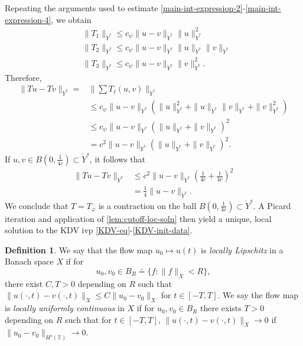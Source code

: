 \documentclass[12pt,reqno]{amsart}
\numberwithin{equation}{section}  %
\numberwithin{figure}{section}
\newcommand{\ci}{\mathbb{T}}
\newcommand{\vp}{\varphi}
\theoremstyle{plain}
\theoremstyle{definition}
\newtheorem{definition}{Definition}
\theoremstyle{remark}
\begin{document}
Repeating the arguments used to estimate 
\eqref{main-int-expression-2}-\eqref{main-int-expression-4}, we obtain
%
\begin{equation*}
	\begin{split}
		& \|T_1\|_{\dot{Y}^s} \le c_\psi \|u -v \|_{\dot{Y}^s} \|u\|^2_{\dot{Y}^s}
		\\
		& \|T_2\|_{\dot{Y}^s} \le c_\psi \|u -v \|_{\dot{Y}^s} \|u\|_{\dot{Y}^s} \|v\|_{\dot{Y}^s}
		\\
		& \|T_3\|_{\dot{Y}^s} \le c_\psi \|u -v \|_{\dot{Y}^s} \|v\|_{\dot{Y}^s}^2.
	\end{split}
\end{equation*}
%
Therefore,
%
\begin{equation}
	\label{20a}
	\begin{split}
		\|Tu - Tv \|_{\dot{Y}^s} = & \| \sum T_\ell(u, v) \|_{\dot{Y}^s}
		\\
		& \le c_\psi \|u -v \|_{\dot{Y}^s} \left( \|u\|_{\dot{Y}^s}^2 + 
		\|u\|_{\dot{Y}^s} \|v\|_{\dot{Y}^s} + \|v\|_{\dot{Y}^s}^2 \right)
		\\
		& \le c_\psi \|u -v\|_{\dot{Y}^s} \left( \|u\|_{\dot{Y}^s} + \|v\|_{\dot{Y}^s} \right)^2
		\\
		& = c^2 \|u -v\|_{\dot{Y}^s} \left( \|u\|_{\dot{Y}^s} + \|v\|_{\dot{Y}^s} \right)^2.
	\end{split}
\end{equation}
%
If $u, v \in B(0, \frac{1}{4c}) \subset \dot{Y}^s$, it follows that
%
\begin{equation}
	\label{21a}
	\begin{split}
		\|Tu - Tv \|_{\dot{Y}^s}
		& \le c^2 \|u -v \|_{\dot{Y}^s} \left( \frac{1}{4c} + 
		\frac{1}{4c} \right)^2
		\\
		& = \frac{1}{4} \|u -v \|_{\dot{Y}^s}. 
	\end{split}
\end{equation}
%
We conclude that $T = T_{\vp}$ is a contraction on the ball $B(0, 
\frac{1}{4c}) \subset \dot{Y}^s$. A Picard iteration and application of 
\autoref{lem:cutoff-loc-soln} then yield a unique, local
solution to the KDV ivp \eqref{KDV-eq}-\eqref{KDV-init-data}.
\begin{definition}
	We say that the flow map $u_0 \mapsto u(t)$ is \emph{locally Lipschitz} in a Banach
	space $X$ if for
	$$u_0, v_0 \in B_R \doteq \{f: \|f\|_X < R\},$$ there exist $C, T>0$
	depending on $R$ such that $\|u(\cdot, t) - v(\cdot, t)
	\|_X \le C \|u_{0} - v_0 \|_{X}$ for $t \in [-T, T]$. We
	say the flow map is \emph{locally uniformly
	continuous} in $X$ if for
	$u_0, v_0 \in B_R$ there exists $T >0$ depending on $R$ such that for
	$t \in [-T, T]$, $\|u(\cdot, t) - v(\cdot, t) \|_{X} \to
	0$ if $\|u_0 - v_0 \|_{H^{s}(\ci)} \to 0$. 
\end{definition}
\end{document}
